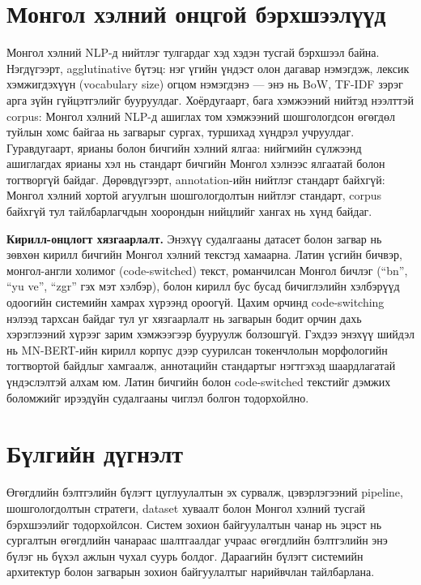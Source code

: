 \section{Монгол хэлний онцгой бэрхшээлүүд}

Монгол хэлний NLP-д нийтлэг тулгардаг хэд хэдэн тусгай бэрхшээл байна.
Нэгдүгээрт, agglutinative бүтэц: нэг үгийн үндэст олон дагавар нэмэгдэж, лексик
хэмжигдэхүүн (vocabulary size) огцом нэмэгдэнэ --- энэ нь BoW, TF-IDF зэрэг
арга зүйн гүйцэтгэлийг бууруулдаг. Хоёрдугаарт, бага хэмжээний нийтэд нээлттэй
corpus: Монгол хэлний NLP-д ашиглах том хэмжээний шошгологдсон өгөгдөл туйлын
хомс байгаа нь загварыг сургах, туршихад хүндрэл учруулдаг. Гуравдугаарт,
ярианы болон бичгийн хэлний ялгаа: нийгмийн сүлжээнд ашиглагдах ярианы хэл нь
стандарт бичгийн Монгол хэлнээс ялгаатай болон тогтворгүй байдаг. Дөрөвдүгээрт,
annotation-ийн нийтлэг стандарт байхгүй: Монгол хэлний хортой агуулгын
шошгологдолтын нийтлэг стандарт, corpus байхгүй тул тайлбарлагчдын хоорондын
нийцлийг хангах нь хүнд байдаг.

\textbf{Кирилл-онцлогт хязгаарлалт.} Энэхүү судалгааны датасет болон загвар нь
зөвхөн кирилл бичгийн Монгол хэлний текстэд хамаарна. Латин үсгийн бичвэр,
монгол-англи холимог (code-switched) текст, романчилсан Монгол бичлэг (``bn'',
``yu ve'', ``zgr'' гэх мэт хэлбэр), болон кирилл бус бусад бичиглэлийн хэлбэрүүд
одоогийн системийн хамрах хүрээнд ороогүй. Цахим орчинд code-switching нэлээд
тархсан байдаг тул уг хязгаарлалт нь загварын бодит орчин дахь хэрэглээний
хүрээг зарим хэмжээгээр бууруулж болзошгүй. Гэхдээ энэхүү шийдэл нь MN-BERT-ийн
кирилл корпус дээр суурилсан токенчлолын морфологийн тогтвортой байдлыг
хамгаалж, аннотацийн стандартыг нэгтгэхэд шаардлагатай үндэслэлтэй алхам юм.
Латин бичгийн болон code-switched текстийг дэмжих боломжийг ирээдүйн судалгааны
чиглэл болгон тодорхойлно.

\section{Бүлгийн дүгнэлт}

Өгөгдлийн бэлтгэлийн бүлэгт цуглуулалтын эх сурвалж, цэвэрлэгээний pipeline,
шошгологдолтын стратеги, dataset хуваалт болон Монгол хэлний тусгай бэрхшээлийг
тодорхойлсон. Систем зохион байгуулалтын чанар нь эцэст нь сургалтын өгөгдлийн
чанараас шалтгаалдаг учраас өгөгдлийн бэлтгэлийн энэ бүлэг нь бүхэл ажлын
чухал суурь болдог. Дараагийн бүлэгт системийн архитектур болон загварын зохион
байгуулалтыг нарийвчлан тайлбарлана.

